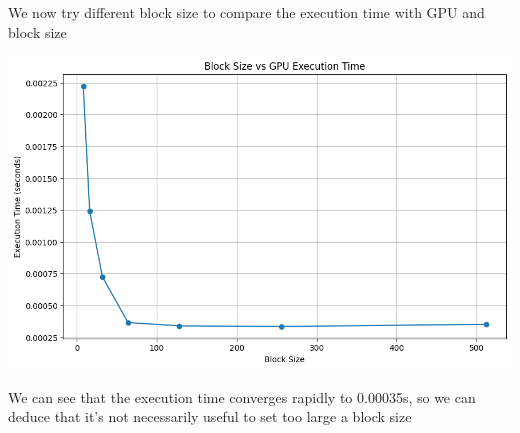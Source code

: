 \documentclass{article}
\begin{document}
We now try different block size to compare the execution time with GPU and block size

\includegraphics[scale=0.5]{src/block_size.png}

We can see that the execution time converges rapidly to 0.00035s, 
so we can deduce that it's not necessarily useful to set too large a block size
\end{document}
